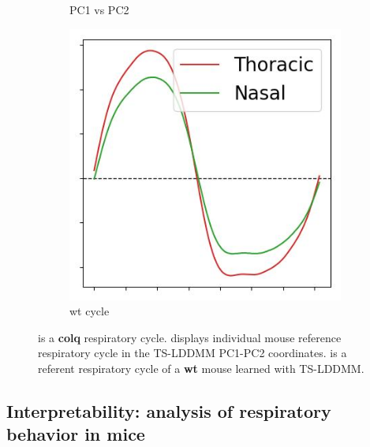 \begin{figure}[t]
\begin{subfigure}[b]{0.15\textwidth}
    \caption{PC1 vs PC2}
    \label{fig: pcs-scatter}
  \end{subfigure}
  \begin{subfigure}[b]{0.15\textwidth}
    \centering
    \includegraphics[width = \textwidth]{pictures/exp_1_wt.jpeg}
    \caption{wt cycle}
    \label{fig:wt-reference}
  \end{subfigure}
  \caption{ is a \textbf{colq} respiratory cycle.  displays individual mouse reference respiratory cycle in the TS-LDDMM PC1-PC2 coordinates.  is a referent respiratory cycle of a \textbf{wt} mouse learned with TS-LDDMM. }
  \vspace{-1em}
\end{figure}
\vspace{-1ex}
\subsection{Interpretability: analysis of respiratory behavior in mice}
\label{section:interpretability}
\vspace{-1ex}





